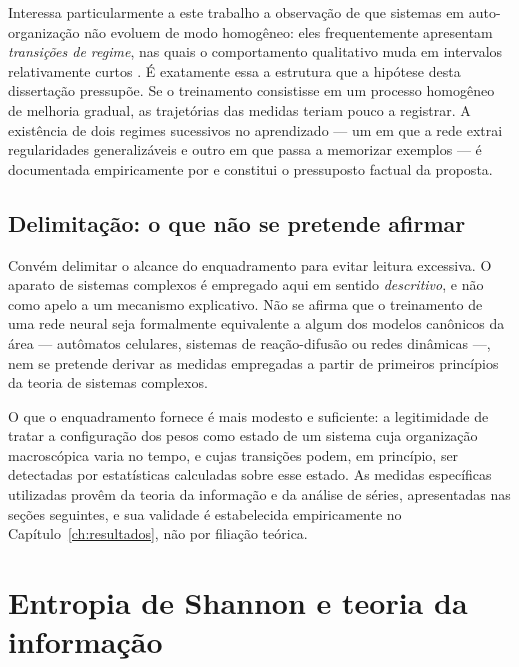 Interessa particularmente a este trabalho a observação de que sistemas em
auto-organização não evoluem de modo homogêneo: eles frequentemente apresentam
\emph{transições de regime}, nas quais o comportamento qualitativo muda em
intervalos relativamente curtos \cite{sayama2015}. É exatamente essa a estrutura
que a hipótese desta dissertação pressupõe. Se o treinamento consistisse em um
processo homogêneo de melhoria gradual, as trajetórias das medidas teriam pouco
a registrar. A existência de dois regimes sucessivos no aprendizado --- um em que
a rede extrai regularidades generalizáveis e outro em que passa a memorizar
exemplos --- é documentada empiricamente por  e constitui
o pressuposto factual da proposta.

\subsection{Delimitação: o que não se pretende afirmar}

Convém delimitar o alcance do enquadramento para evitar leitura excessiva. O
aparato de sistemas complexos é empregado aqui em sentido \emph{descritivo}, e
não como apelo a um mecanismo explicativo. Não se afirma que o treinamento de
uma rede neural seja formalmente equivalente a algum dos modelos canônicos da
área --- autômatos celulares, sistemas de reação-difusão ou redes dinâmicas
\cite{sayama2015} ---, nem se pretende derivar as medidas empregadas a partir de
primeiros princípios da teoria de sistemas complexos.

O que o enquadramento fornece é mais modesto e suficiente: a legitimidade de
tratar a configuração dos pesos como estado de um sistema cuja organização
macroscópica varia no tempo, e cujas transições podem, em princípio, ser
detectadas por estatísticas calculadas sobre esse estado. As medidas
específicas utilizadas provêm da teoria da informação e da análise de séries,
apresentadas nas seções seguintes, e sua validade é estabelecida empiricamente
no Capítulo~\ref{ch:resultados}, não por filiação teórica.

\section{Entropia de Shannon e teoria da informação}
\label{sec:teoria-informacao}

